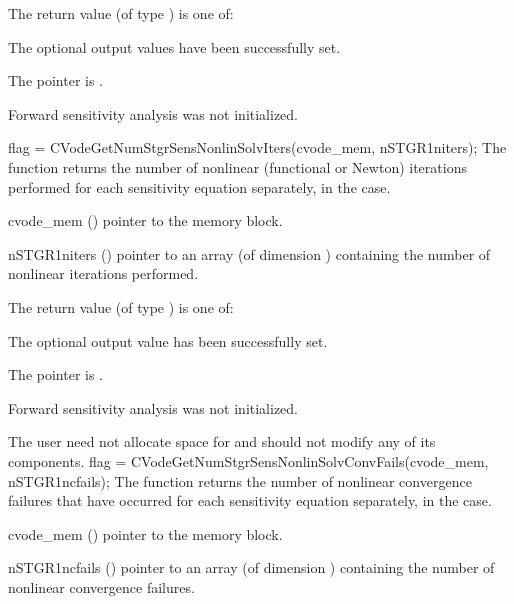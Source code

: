 {
  The return value  (of type ) is one of:
  \begin{args}
  \item[\Id{CV\_SUCCESS}] 
    The optional output values have been successfully set.
  \item[\Id{CV\_MEM\_NULL}]
    The  pointer is .
  \item[\Id{CV\_NO\_SENS}]
    Forward sensitivity analysis was not initialized.
  \end{args}
}
{}
{
  flag = CVodeGetNumStgrSensNonlinSolvIters(cvode\_mem, nSTGR1niters);
}
{
  The function  returns the
  number of nonlinear (functional or Newton) iterations performed for 
  each sensitivity equation separately, in the  case.
}
{
  \begin{args}
  \item[cvode\_mem] ()
    pointer to the {\cvodes} memory block.
  \item[nSTGR1niters] ()
    pointer to an array (of dimension ) containing the number of 
    nonlinear iterations performed.
  \end{args}
}
{
  The return value  (of type ) is one of:
  \begin{args}
  \item[\Id{CV\_SUCCESS}] 
    The optional output value has been successfully set.
  \item[\Id{CV\_MEM\_NULL}]
    The  pointer is .
  \item[\Id{CV\_NO\_SENS}]
    Forward sensitivity analysis was not initialized.
  \end{args}
}
{
  The user need not allocate space for  and should not modify
  any of its components.
}
{
  flag = CVodeGetNumStgrSensNonlinSolvConvFails(cvode\_mem, nSTGR1ncfails);
}
{
  The function  returns the
  number of nonlinear convergence failures that have occurred for
  each sensitivity equation separately, in the  case.
}
{
  \begin{args}
  \item[cvode\_mem] ()
    pointer to the {\cvodes} memory block.
  \item[nSTGR1ncfails] ()
    pointer to an array (of dimension ) containing the 
    number of nonlinear convergence failures.
  \end{args}
}
